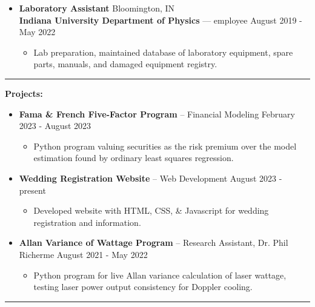 \documentclass[letterpaper]{cream_class}
\begin{document}
\begin{itemize}[noitemsep, leftmargin=*]
\begin{itemize}[noitemsep, leftmargin=*]
    \end{itemize}    
  \item {\large\textbf{Laboratory Assistant}} \hfill Bloomington, IN \\
        \textbf{Indiana University Department of Physics} — employee \hfill August 2019 - May 2022
    \begin{itemize}[noitemsep, leftmargin=*]
      \item Lab preparation, maintained database of laboratory equipment, spare parts, manuals, and damaged equipment registry.
    \end{itemize}
\end{itemize}
  \hrule
  \vspace{6pt}
  
\noindent\textcolor{burgundy}{\noindent\textbf{\large Projects:}\\[-3ex]}
\vspace{-3pt}
\begin{itemize}[noitemsep, leftmargin=*, itemsep=1pt]
    \item \textbf{\large Fama \& French Five-Factor Program} -- Financial Modeling \hfill February 2023 - August 2023
    \begin{itemize}[noitemsep, leftmargin=*, itemsep=1pt]
      \item Python program valuing securities as the risk premium over the model estimation found by ordinary least squares regression.
      \end{itemize}
    \item \textbf{\large Wedding Registration Website} -- Web Development \hfill August 2023 - present
    \begin{itemize}[noitemsep, leftmargin=*, itemsep=1pt]
      \item Developed website with HTML, CSS, \& Javascript for wedding registration and information.
      \end{itemize}
    \item \textbf{\large Allan Variance of Wattage Program} -- Research Assistant, Dr. Phil Richerme \hfill August 2021 - May 2022
    \begin{itemize}[noitemsep, leftmargin=*, itemsep=1pt]
      \item Python program for live Allan variance calculation of laser wattage, testing laser power output consistency for Doppler cooling.
    \end{itemize}
\end{itemize}     
  \hrule
  \vspace{6pt}
  
\end{document}
